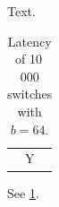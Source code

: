 \documentclass{article}
\begin{document}
\listoftables
Text.
\begin{table}[h]
\caption{Latency of 10\,000 switches with $b=64$.}\label{a}
\centering
\begin{tabular}{c}Y\end{tabular}
\end{table}
See \ref{a}.
\end{document}
